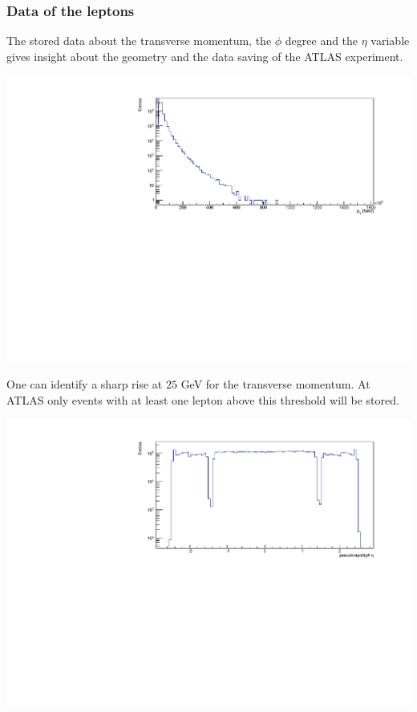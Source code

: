 \documentclass[12pt, a4paper, bibliography=totoc]{scrartcl}
\begin{document}
\begin{multicols}{2}
\subsubsection{Data of the leptons}
The stored data about the transverse momentum, the $\phi$ degree and the $\eta$ variable gives insight about the geometry and the data saving of the ATLAS experiment.
\begin{center}
    \includegraphics[width=\linewidth]{fig/p_T_final.pdf}
\end{center}    
One can identify a sharp rise at $25$ GeV for the transverse momentum. At ATLAS only events with at least one lepton above this threshold will be stored.
\begin{center}
    \includegraphics[width=\linewidth]{fig/eta_final.pdf}

\end{center}
\end{multicols}
\end{document}
